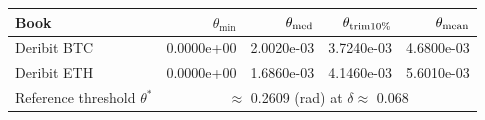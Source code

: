 \begin{tabular}{@{}lrrrr@{}}
\toprule
Book & $\theta_{\min}$ & $\theta_{\rm med}$ & $\theta_{\rm trim10\%}$ & $\theta_{\rm mean}$ \\
\midrule
Deribit BTC & 0.0000e+00 & 2.0020e-03 & 3.7240e-03 & 4.6800e-03 \\
Deribit ETH & 0.0000e+00 & 1.6860e-03 & 4.1460e-03 & 5.6010e-03 \\
\midrule
Reference threshold $\theta^{*}$ & \multicolumn{4}{c}{$\approx$ 0.2609 (rad) at $\delta \approx$ 0.068} \\
\bottomrule
\end{tabular}
